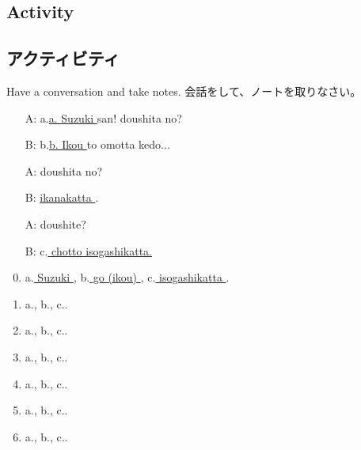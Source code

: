 \documentclass[uplatex,dvipdfmx,b5paper,english,10pt]{jsbook}
\begin{document}
\ifEnglish
\subsection{Activity}
\else
\subsection{アクティビティ}
\fi

\begin{toiquestion}
\ifEnglish
Have a conversation and take notes.
\else
会話をして、ノートを取りなさい。
\fi
\end{toiquestion}

\begin{itemize}
 \item[A:] a.\underline{a. Suzuki \hspace{1zw}} san! doushita no?
 \item[B:] b.\underline{b. Ikou \hspace{1zw}} to omotta kedo...
 \item[A:] doushita no?
 \item[B:] \underline{ ikanakatta \hspace{1zw}}.
 \item[A:] doushite?
 \item[B:] c.\underline{ chotto isogashikatta.\hspace{1zw}}
\end{itemize}

\begin{enumerate}
 \setcounter{enumi}{-1}
 \item a.\underline{ Suzuki \hspace{6.5em}}, b.\underline{ go (ikou) \hspace{7.45em}}, c.\underline{ isogashikatta \hspace{1.2em}}.
 \item a.\underline{\hspace{10em}}, b.\underline{\hspace{9em}}, c.\hrulefill.
 \item a.\underline{\hspace{10em}}, b.\underline{\hspace{9em}}, c.\hrulefill.
 \item a.\underline{\hspace{10em}}, b.\underline{\hspace{9em}}, c.\hrulefill.
 \item a.\underline{\hspace{10em}}, b.\underline{\hspace{9em}}, c.\hrulefill.
 \item a.\underline{\hspace{10em}}, b.\underline{\hspace{9em}}, c.\hrulefill.
 \item a.\underline{\hspace{10em}}, b.\underline{\hspace{9em}}, c.\hrulefill.
\end{enumerate}
\end{document}
